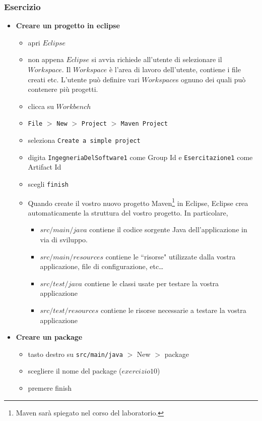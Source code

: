 \documentclass{article}
\theoremstyle{definition}
\begin{document}
\subsubsection{Esercizio}

\begin{itemize}
\item \textbf{Creare un progetto in eclipse}
\begin{itemize}
\item apri $Eclipse$
\item non appena $Eclipse$ si avvia richiede all'utente di selezionare il $Workspace$. Il $Workspace$ \`e l'area di lavoro dell'utente, contiene i file creati etc. L'utente pu\`o definire vari $Workspace$s ognuno dei quali pu\`o contenere pi\`u progetti.
\item clicca su $Workbench$ 
\item \texttt{File} $>$ \texttt{New} $>$ \texttt{Project} $>$ \texttt{Maven Project}
\item seleziona \texttt{Create a simple project}
\item digita \texttt{IngegneriaDelSoftware1} come Group Id e \texttt{Esercitazione1} come Artifact Id
\item scegli \texttt{finish}
\item Quando create il vostro nuovo progetto Maven\footnote{Maven sar\`a spiegato nel corso del laboratorio.} in Eclipse, Eclipse crea automaticamente la struttura del vostro progetto. In particolare, 
\begin{itemize}
\item $src/main/java$ contiene il codice sorgente Java dell'applicazione in via di sviluppo.
\item $src/main/resources$ contiene le ``risorse" utilizzate dalla vostra applicazione, file di configurazione, etc\ldots
\item $src/test/java$ contiene le classi usate per testare la vostra applicazione
\item $src/test/resources$ contiene le risorse necessarie a testare la vostra applicazione
\end{itemize}
\end{itemize}
\end{itemize}



\begin{itemize}
\item \textbf{Creare un package}
\begin{itemize}
\item tasto destro su \texttt{src/main/java} $>$ New $>$ package 
\item scegliere il nome del package ($exercizio10$)
\item premere finish
\end{itemize}
\end{itemize}
\end{document}

